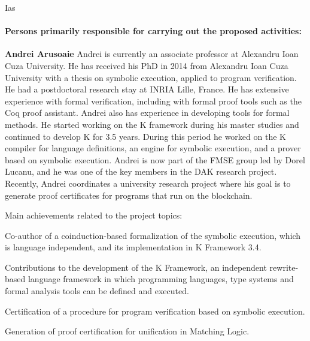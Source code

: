 \begin{sitedescription}{Ias}
\paragraph*{Persons primarily responsible for carrying out the proposed activities:}

\begin{compactitem} %
\item{\bf Andrei Arusoaie}
Andrei is currently an associate professor at Alexandru Ioan Cuza University. He has received his PhD in 2014 from Alexandru Ioan Cuza University with a thesis on symbolic execution, applied to program verification. He had a postdoctoral research stay at INRIA Lille, France. He has extensive experience with formal verification, including with formal proof tools such as the Coq proof assistant. Andrei also has experience in developing tools for formal methods. He started working on the K framework during his master studies and continued to develop K for 3.5 years. During this period he worked on the K compiler for language definitions, an engine for symbolic execution, and a prover based on symbolic execution. 
Andrei is now part of the FMSE group led by Dorel Lucanu, and he was one of the key members in the DAK research project. Recently, Andrei coordinates a university  research project where his goal is to generate proof certificates for programs that run on the blockchain.

Main achievements related to the project topics:
\begin{compactitem}
\item Co-author of a coinduction-based formalization of the symbolic execution, which is language independent, and its implementation in K Framework 3.4.
\item Contributions to the development of the K Framework, an independent rewrite-based language framework in which programming languages, type systems and formal analysis tools can be defined and executed.
\item Certification of a procedure for program verification based on symbolic execution.
\item Generation of proof certification for unification in Matching Logic.
\end{compactitem}


\end{compactitem}
\end{sitedescription}

